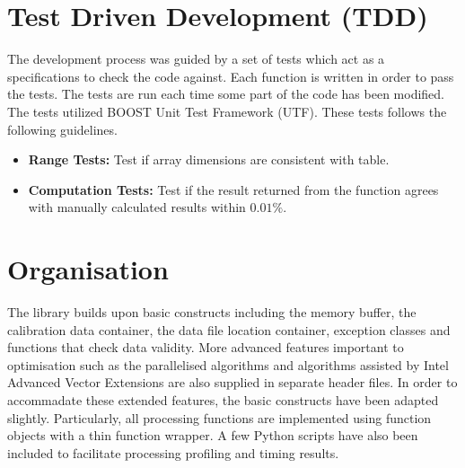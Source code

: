 \documentclass[journal]{IEEEtran}
\begin{document}
\section{Test Driven Development (TDD)} %

The development process was guided by a set of tests which act as a specifications to check the code against. Each function is written in order to pass the tests. The tests are run each time some part of the code has been modified. The tests utilized BOOST Unit Test Framework (UTF). These tests follows the following guidelines.
\begin{itemize}
 \item \textbf{Range Tests:} Test if array dimensions are consistent with table.
 \item \textbf{Computation Tests:} Test if the result returned from the function agrees with manually calculated results within $0.01\%$.	
\end{itemize}

\section{Organisation}	%
The library builds upon basic constructs including the memory buffer, the calibration data container, the data file location container, exception classes and functions that check data validity. More advanced features important to optimisation such as the parallelised algorithms and algorithms assisted by Intel Advanced Vector Extensions are also supplied in separate header files. In order to accommadate these extended features, the basic constructs have been adapted slightly. Particularly, all processing functions are implemented using function objects with a thin function wrapper. A few Python scripts have also been included to facilitate processing profiling and timing results.
\end{document}
